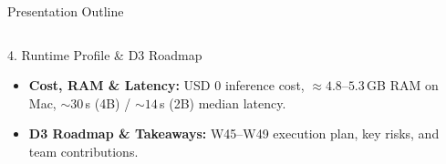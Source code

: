 \documentclass[aspectratio=1610,11pt]{beamer}
\begin{document}
\begin{frame}{Presentation Outline}
\begin{columns}[T]
    \begin{block}{4. Runtime Profile \& D3 Roadmap}
      \scriptsize
      \begin{itemize}\scriptsize
        \item \textbf{Cost, RAM \& Latency:} USD 0 inference cost, $\approx 4.8\text{--}5.3$\,GB RAM on Mac, $\sim 30$\,s (4B) / $\sim 14$\,s (2B) median latency.
        \item \textbf{D3 Roadmap \& Takeaways:} W45--W49 execution plan, key risks, and team contributions.
      \end{itemize}
    \end{block}
  \end{columns}
\end{frame}

\end{document}
